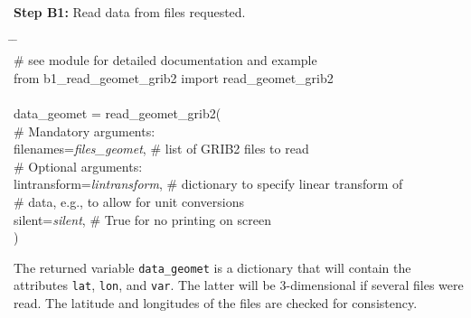 \documentclass[10pt,a4paper,titlepage,parskip]{scrartcl}
\newenvironment{ttfont}{\fontfamily{\ttdefault}\selectfont}{\par}
\newcommand{\GRAU}[1]{\textcolor{ufzgray2}{#1}}
\begin{document}
\textbf{Step B1:} Read data from files requested.
\begin{framed}
	\vspace*{-1.2cm}
	\begin{ttfont}
		\begin{tabbing}
			\hspace{1.0cm} \= \hspace{5.2cm} \= \kill \\[4pt]
			\GRAU{\# see module for detailed documentation and example}\\
			from b1\_read\_geomet\_grib2 import read\_geomet\_grib2\\
			\\
			data\_geomet = read\_geomet\_grib2(\\
			\> \GRAU{\# Mandatory arguments:}\\
			\> filenames=\textit{files\_geomet}, \> \GRAU{\# list of GRIB2 files to read}\\
			\> \GRAU{\# Optional arguments:}\\
			\> lintransform=\textit{lintransform}, \> \GRAU{\# dictionary to specify linear transform of}\\
			\>  \> \GRAU{\# data, e.g., to allow for unit conversions}\\
			\> silent=\textit{silent}, \> \GRAU{\# True for no printing on screen}\\
			\> ) \> 
		\end{tabbing}
	\end{ttfont}
	\vspace*{-0.3cm}
\end{framed}
\vspace*{-0.3cm}
The returned variable \texttt{data\_geomet} is a dictionary that will contain the attributes \texttt{lat}, \texttt{lon}, and \texttt{var}. The latter will be 3-dimensional if several files were read. The latitude and longitudes of the files are checked for consistency.
\end{document}
